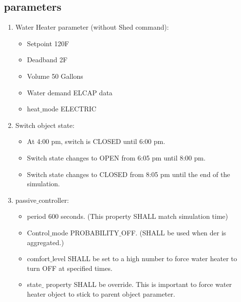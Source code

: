 \subsection{parameters}
    \begin{enumerate}
        \item Water Heater parameter (without Shed command):
        \begin{itemize}
        \item Setpoint 120F
        \item Deadband 2F
        \item Volume 50 Gallons
        \item Water demand ELCAP data
        \item heat$\_$mode ELECTRIC
        \end{itemize}
        \item Switch object state:
            \begin{itemize}
                \item At 4:00 pm, switch is CLOSED until 6:00 pm.
                \item Switch state changes to OPEN from 6:05 pm until 8:00 pm.
                \item Switch state changes to CLOSED from 8:05 pm until the end of the simulation.
            \end{itemize}
        \item passive$\_$controller:
            \begin{itemize}
                \item period 600 seconds. (This property SHALL match simulation time)
                \item Control$\_$mode PROBABILITY$\_$OFF. (SHALL be used when der is aggregated.)
                \item comfort$\_$level SHALL be set to a high number to force water heater to turn OFF at specified times.
                \item state$\_$ property SHALL be override. This is important to force water heater object to stick to parent object parameter.
            \end{itemize}
    \end{enumerate}
